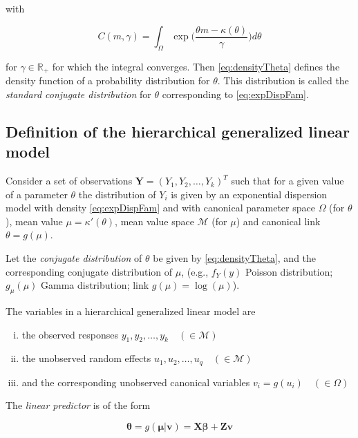 \documentclass[a4paper,twoside,11pt]{report} %
\theoremstyle{definition}
\theoremstyle{definition}
\theoremstyle{definition}
\theoremstyle{definition}
\theoremstyle{remark}
\begin{document}
with

\begin{equation}
  C(m,\gamma)=\int_\Omega \exp\Big(\frac{\theta m-\kappa(\theta)}{\gamma}\Big)d\theta
\end{equation}

for \(\gamma\in\mathbb{R}_+\) for which the integral converges. Then \eqref{eq:densityTheta} defines the density function of a probability distribution for \(\theta\). This distribution is called the \textit{standard conjugate distribution} for \(\theta\) corresponding to \eqref{eq:expDispFam}.

\subsection{Definition of the hierarchical generalized linear model}

Consider a set of observations \(\boldsymbol Y=(Y_1,Y_2,\dots,Y_k)^T\) such that for a given value of a parameter \(\theta\) the distribution of \(Y_i\) is given by an exponential dispersion model with density \eqref{eq:expDispFam} and with canonical parameter space \(\Omega\) (for \(\theta\)), mean value \(\mu=\kappa'(\theta)\), mean value space \(\mathcal{M}\) (for \(\mu\)) and canonical link \(\theta=g(\mu)\).

Let the \textit{conjugate distribution} of \(\theta\) be given by \eqref{eq:densityTheta}, and the corresponding conjugate distribution of \(\mu\), (e.g., \(f_Y(y)\) Poisson distribution; \(g_\mu(\mu)\) Gamma distribution; link \(g(\mu)=\log(\mu)\)).

The variables in a hierarchical generalized linear model are

\begin{enumerate}[i)]
  \item the observed responses $y_1, y_2, \dots, y_k \quad (\in\mathcal{M})$
  \item the unobserved random effects $u_1,u_2,\dots,u_q \quad (\in\mathcal{M})$
  \item and the corresponding unobserved canonical variables $v_i=g(u_i) \quad (\in \Omega)$
\end{enumerate}

The \textit{linear predictor} is of the form

\begin{equation}
  \boldsymbol \theta = g(\boldsymbol \mu|\boldsymbol v)=\boldsymbol{X\beta}+\boldsymbol{Zv}
\end{equation}
\end{document}
